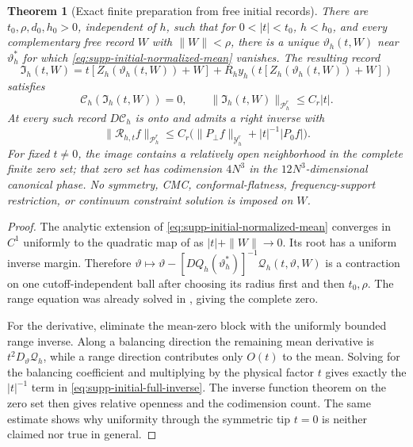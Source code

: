 \documentclass[11pt]{article}
\newtheorem{theorem}{Theorem}[section]
\numberwithin{equation}{section}
\theoremstyle{definition}
\theoremstyle{remark}
\begin{document}
\begin{theorem}[Exact finite preparation from free initial records]
\label{thm:supp-action-prepared-chart}
There are $t_0,\rho,d_0,h_0>0$, independent of $h$, such that for
$0<|t|<t_0$, $h<h_0$, and every complementary free record $W$ with
$\|W\|<\rho$, there is a unique $\vartheta_h(t,W)$ near
$\vartheta_h^*$ for which \eqref{eq:supp-initial-normalized-mean} vanishes.
The resulting record
\begin{equation}
 \mathfrak I_h(t,W)
 =t[Z_h(\vartheta_h(t,W))+W]
   +R_hy_h(t[Z_h(\vartheta_h(t,W))+W])
 \label{eq:supp-initial-prepared-record}
\end{equation}
satisfies
\begin{equation}
 \mathscr C_h(\mathfrak I_h(t,W))=0,
 \qquad \|\mathfrak I_h(t,W)\|_{\mathcal P_h^r}\le C_r|t|.
 \label{eq:supp-initial-exact-zero}
\end{equation}
At every such record $D\mathscr C_h$ is onto and admits a right inverse with
\begin{equation}
 \|\mathscr R_{h,t}f\|_{\mathcal P_h^r}
 \le C_r\bigl(\|P_\perp f\|_{\mathcal Y_h^r}+|t|^{-1}|P_0f|\bigr).
 \label{eq:supp-initial-full-inverse}
\end{equation}
For fixed $t\ne0$, the image contains a relatively open neighborhood in the
complete finite zero set; that zero set has codimension $4N^3$ in the
$12N^3$-dimensional canonical phase.  No symmetry, CMC, conformal-flatness,
frequency-support restriction, or continuum constraint solution is imposed
on $W$.
\end{theorem}
\begin{proof}
The analytic extension of \eqref{eq:supp-initial-normalized-mean} converges in
$C^1$ uniformly to the quadratic map of
 as $|t|+\|W\|\to0$.  Its root has a uniform
inverse margin.  Therefore
$\vartheta\mapsto\vartheta-[DQ_h(\vartheta_h^*)]^{-1}
\mathcal Q_h(t,\vartheta,W)$ is a contraction on one cutoff-independent ball
after choosing its radius first and then $t_0,\rho$.  The range equation was
already solved in , giving the complete zero.

For the derivative, eliminate the mean-zero block with the uniformly bounded
range inverse.  Along a balancing direction the remaining mean derivative is
$t^2D_\vartheta\mathcal Q_h$, while a range direction contributes only
$O(t)$ to the mean.  Solving for the balancing coefficient and multiplying by
the physical factor $t$ gives exactly the $|t|^{-1}$ term in
\eqref{eq:supp-initial-full-inverse}.  The inverse function theorem on the
zero set then gives relative openness and the codimension count.  The same
estimate shows why uniformity through the symmetric tip $t=0$ is neither
claimed nor true in general.
\end{proof}
\end{document}
